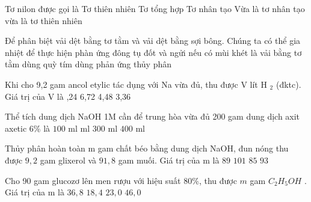 \begin{ex}
	Tơ nilon được gọi là
	\choice
	{Tơ thiên nhiên}
	{\True Tơ tổng hợp}
	{Tơ nhân tạo}
	{Vừa là tơ nhân tạo vừa là tơ thiên nhiên}
\end{ex}
\begin{ex}
	Để phân biệt vải dệt bằng tơ tằm và vải dệt bằng sợi bông. Chúng ta có thể
	\choice
	{gia nhiệt để thực hiện phàn ứng đông tụ}
	{\True đốt và ngửi nếu có mùi khét là vải bằng tơ tằm}
	{dùng quỳ tím}
	{dùng phản ứng thủy phân}
\end{ex}
\begin{ex}
	Khi cho 9,2 gam ancol etylic tác dụng với Na vừa đủ, thu được V lít H $_2$ (đktc). Giá trị của V là
	\choice
	{,24}
	{6,72}
	{4,48}
	{3,36}
\end{ex}
\begin{ex}
	Thể tích dung dịch NaOH 1M cần để trung hòa vừa đủ 200 gam dung dịch axit axetic 6\% là
	\choice
	{$100$ ml}
	{ ml}
	{$300$ ml}
	{$400$ ml}
	\loigiai{}
\end{ex}
\begin{ex}Thủy phân hoàn toàn m gam chất béo bằng dung dịch NaOH, đun nóng thu được $9{,}2$ gam glixerol và $91{,}8$ gam muối. Giá trị của m là
	\choice
	{\True $89$}
	{$101$}
	{$85$}
	{$93$}
	\loigiai{}
\end{ex}
\begin{ex}
	Cho 90 gam glucozơ lên men rượu với hiệu suất $80\%$, thu được $m$ gam  $C_2H_5OH$ . Giá trị của m là
	\choice
	{\True $36{,}8$}
	{$18{,}4$}
	{$23{,}0$}
	{$46{,}0$}
	\loigiai{}
\end{ex}
